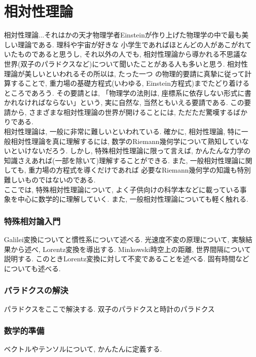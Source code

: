 \documentclass[a4j,dvipdfmx]{jsarticle}
\numberwithin{equation}{section}
\begin{document}
    \part{相対性理論}
    \begin{screen}
        相対性理論...それはかの天才物理学者Einsteinが作り上げた物理学の中で最も美しい理論である. 理科や宇宙が好きな
        小学生であればほとんどの人があこがれていたものであると思うし, それ以外の人でも, 相対性理論から導かれる不思議な
        世界(双子のパラドクスなど)について聞いたことがある人も多いと思う. 相対性理論が美しいといわれるその所以は, たった一つ
        の物理的要請に真摯に従って計算することで, 重力場の基礎方程式(いわゆる, Einstein方程式)までたどり着けるところであろう. 
        その要請とは, 「物理学の法則は, 座標系に依存しない形式に書かれなければならない」という, 実に自然な, 当然ともいえる要請である.
        この要請から, さまざまな相対性理論の世界が開けることには, ただただ驚嘆するばかりである.\\
        相対性理論は, 一般に非常に難しいといわれている. 確かに, 相対性理論, 特に一般相対性理論を真に理解するには, 数学のRiemann幾何学について熟知していないといけないだろう.
        しかし, 特殊相対性理論に限って言えば, かんたんな力学の知識さえあれば(一部を除いて)理解することができる. また, 一般相対性理論に関しても, 重力場の方程式を導くだけであれば
        必要なRiemann幾何学の知識も特別難しいものではないのである.\\
        ここでは, 特殊相対性理論について, よく子供向けの科学本などに載っている事象を中心に数学的に理解していく.
        また, 一般相対性理論についても軽く触れる.
    \end{screen}
    \clearpage
    \section{特殊相対論入門}
        Galilei変換についてと慣性系について述べる. 光速度不変の原理について, 実験結果から述べ, Lorentz変換を導出する. 
         Minkowski時空上の距離, 世界間隔について説明する. このときLorentz変換に対して不変であることを述べる.
        固有時間などについても述べる.
    \clearpage
    \section{パラドクスの解決}
        パラドクスをここで解決する. 双子のパラドクスと時計のパラドクス
    \clearpage
    \section{数学的準備}
        ベクトルやテンソルについて, かんたんに定義する.
    \clearpage
\end{document}
